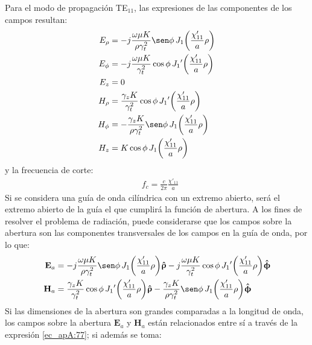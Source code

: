 Para el modo de propagación TE$_{11}$, las expresiones de las componentes de los campos resultan:
\begin{subequations}
\label{grup_ec_apA:27}
\begin{align}
E_{\rho} &= - j\frac{\omega\mu K}{\rho\gamma_t^2}\sen\phi\,J_1\!\left(\frac{\chi '_{11}}{a}\rho\right)
\label{ec_apA:128}\\
E_{\phi} &= - j\frac{\omega\mu K}{\gamma_t^2}\cos\phi\,{J_1}'\!\left(\frac{\chi '_{11}}{a}\rho\right)
\label{ec_apA:129}\\
E_z &= 0
\label{ec_apA:130}\\
H_{\rho} &= \frac{\gamma_zK}{\gamma_t^2}\cos\phi\,{J_1}'\!\left(\frac{\chi '_{11}}{a}\rho\right)
\label{ec_apA:131}\\
H_{\phi} &= - \frac{\gamma_zK}{\rho\gamma_t^2}\sen\phi\,J_1\!\left(\frac{\chi '_{11}}{a}\rho\right)
\label{ec_apA:132}\\
H_z &= K\cos\phi\,J_1\!\left(\frac{\chi '_{11}}{a}\rho\right)
\label{ec_apA:133}
\end{align}
\end{subequations}
y la frecuencia de corte:
\begin{align}
&f_c = \frac{c}{2\pi}\frac{\chi '_{11}}{a}
\label{ec_apA:134}
\end{align}
Si se considera una guía de onda cilíndrica con un extremo abierto, será el extremo abierto de la guía el que cumplirá la función de abertura. A los fines de resolver el problema de radiación, puede considerarse que los campos sobre la abertura son las componentes transversales de los campos en la guía de onda, por lo que:
\begin{subequations}
\label{grup_ec_apA:28}
\begin{align}
\mathbf{E}_a &= - j\frac{\omega\mu K}{\rho\gamma_t^2}\sen\phi\,J_1\!\left(\frac{\chi '_{11}}{a}\rho\right)\!\versor{\uprho} - j\frac{\omega\mu K}{\gamma_t^2}\cos\phi\,{J_1}'\!\left(\frac{\chi '_{11}}{a}\rho\right)\!\versor{\upphi}
\label{ec_apA:135}\\
\mathbf{H}_a &= \frac{\gamma_zK}{\gamma_t^2}\cos\phi\,{J_1}'\!\left(\frac{\chi '_{11}}{a}\rho\right)\!\versor{\uprho} - \frac{\gamma_zK}{\rho\gamma_t^2}\sen\phi\,J_1\!\left(\frac{\chi '_{11}}{a}\rho\right)\!\versor{\upphi}
\label{ec_apA:136}
\end{align}
\end{subequations}
Si las dimensiones de la abertura son grandes comparadas a la longitud de onda, los campos sobre la abertura $\mathbf{E}_a$ y $\mathbf{H}_a$ están relacionados entre sí a través de la expresión \eqref{ec_apA:77}; si además se toma:
